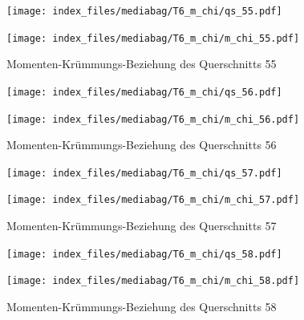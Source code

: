 \documentclass[
  11pt,
  letterpaper,
]{scrreprt}
\begin{document}
\begin{figure}[H]

\begin{minipage}{0.50\linewidth}
\texttt{[image: index\_files/mediabag/T6\_m\_chi/qs\_55.pdf]}\end{minipage}%
%
\begin{minipage}{0.50\linewidth}
\texttt{[image: index\_files/mediabag/T6\_m\_chi/m\_chi\_55.pdf]}\end{minipage}%

\caption{\label{fig-m_chi_appendix}Momenten-Krümmungs-Beziehung des
Querschnitts 55}

\end{figure}%

\begin{figure}[H]

\begin{minipage}{0.50\linewidth}
\texttt{[image: index\_files/mediabag/T6\_m\_chi/qs\_56.pdf]}\end{minipage}%
%
\begin{minipage}{0.50\linewidth}
\texttt{[image: index\_files/mediabag/T6\_m\_chi/m\_chi\_56.pdf]}\end{minipage}%

\caption{\label{fig-m_chi_appendix}Momenten-Krümmungs-Beziehung des
Querschnitts 56}

\end{figure}%

\begin{figure}[H]

\begin{minipage}{0.50\linewidth}
\texttt{[image: index\_files/mediabag/T6\_m\_chi/qs\_57.pdf]}\end{minipage}%
%
\begin{minipage}{0.50\linewidth}
\texttt{[image: index\_files/mediabag/T6\_m\_chi/m\_chi\_57.pdf]}\end{minipage}%

\caption{\label{fig-m_chi_appendix}Momenten-Krümmungs-Beziehung des
Querschnitts 57}

\end{figure}%

\begin{figure}[H]

\begin{minipage}{0.50\linewidth}
\texttt{[image: index\_files/mediabag/T6\_m\_chi/qs\_58.pdf]}\end{minipage}%
%
\begin{minipage}{0.50\linewidth}
\texttt{[image: index\_files/mediabag/T6\_m\_chi/m\_chi\_58.pdf]}\end{minipage}%

\caption{\label{fig-m_chi_appendix}Momenten-Krümmungs-Beziehung des
Querschnitts 58}

\end{figure}%
\end{document}
